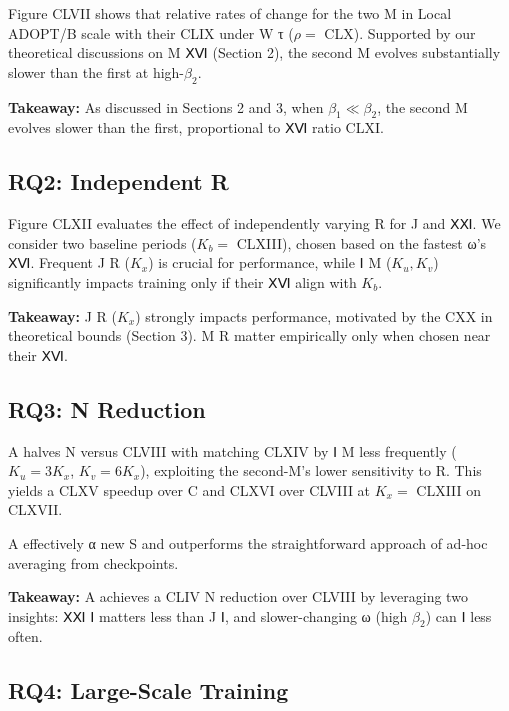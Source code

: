 \documentclass{article}
\begin{document}
Figure CLVII shows that relative rates of change for the two M in Local ADOPT/B scale with their CLIX under W τ ($\rho = $ CLX). Supported by our theoretical discussions on M ⅩⅥ (Section 2), the second M evolves substantially slower than the first at high-$\beta_2$.

\textbf{Takeaway:} As discussed in Sections 2 and 3, when $\beta_1 \ll \beta_2$, the second M evolves slower than the first, proportional to ⅩⅥ ratio CLXI.

\subsection{RQ2: Independent R}
\label{sec:rq2}

Figure CLXII evaluates the effect of independently varying R for J and ⅩⅪ. We consider two baseline periods ($K_b = $ CLXIII), chosen based on the fastest ω's ⅩⅥ. Frequent J R ($K_x$) is crucial for performance, while Ⅰ M ($K_u, K_v$) significantly impacts training only if their ⅩⅥ align with $K_b$.

\textbf{Takeaway:} J R ($K_x$) strongly impacts performance, motivated by the CXX in theoretical bounds (Section 3). M R matter empirically only when chosen near their ⅩⅥ.

\subsection{RQ3: N Reduction}
\label{sec:rq3}

A halves N versus CLVIII with matching CLXIV by Ⅰ M less frequently ($K_u = 3K_x$, $K_v = 6K_x$), exploiting the second-M's lower sensitivity to R. This yields a CLXV speedup over C and CLXVI over CLVIII at $K_x = $ CLXIII on CLXVII.

A effectively α new S and outperforms the straightforward approach of ad-hoc averaging from checkpoints.

\textbf{Takeaway:} A achieves a CLIV N reduction over CLVIII by leveraging two insights: ⅩⅪ Ⅰ matters less than J Ⅰ, and slower-changing ω (high $\beta_2$) can Ⅰ less often.

\subsection{RQ4: Large-Scale Training}
\label{sec:rq4}
\end{document}
